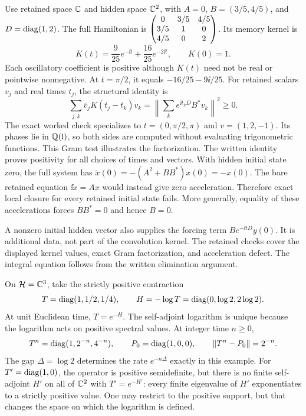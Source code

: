 Use retained space $\CC$ and hidden space $\CC^2$, with $A=0$, $B=(3/5,4/5)$, and $D=\operatorname{diag}(1,2)$. The full Hamiltonian is $\begin{pmatrix}0&3/5&4/5\\3/5&1&0\\4/5&0&2\end{pmatrix}$. Its memory kernel is
\[
K(t)=\frac9{25}e^{-\ii t}+\frac{16}{25}e^{-2\ii t},
\qquad K(0)=1.
\]
Each oscillatory coefficient is positive although $K(t)$ need not be real or pointwise nonnegative. At $t=\pi/2$, it equals $-16/25-9\ii/25$.
For retained scalars $v_j$ and real times $t_j$, the structural identity is
\[
\sum_{j,k}\overline v_jK(t_j-t_k)v_k
=\left\|\sum_k e^{\ii t_kD}B^*v_k\right\|^2\geq0.
\]
The exact worked check specializes to $t=(0,\pi/2,\pi)$ and $v=(1,2,-1)$. Its phases lie in $\QQ(\ii)$, so both sides are computed without evaluating trigonometric functions. This Gram test illustrates the factorization. The written identity proves positivity for all choices of times and vectors.
With hidden initial state zero, the full system has $\ddot x(0)=-(A^2+BB^*)x(0)=-x(0)$. The bare retained equation $\ii\dot x=Ax$ would instead give zero acceleration. Therefore exact local closure for every retained initial state fails. More generally, equality of these accelerations forces $BB^*=0$ and hence $B=0$.

A nonzero initial hidden vector also supplies the forcing term $Be^{-\ii tD}y(0)$. It is additional data, not part of the convolution kernel. The retained checks cover the displayed kernel values, exact Gram factorization, and acceleration defect. The integral equation follows from the written elimination argument.

On $\HH=\CC^3$, take the strictly positive contraction
\[
T=\operatorname{diag}(1,1/2,1/4),\qquad H=-\log T=\operatorname{diag}(0,\log2,2\log2).
\]
At unit Euclidean time, $T=e^{-H}$. The self-adjoint logarithm is unique because the logarithm acts on positive spectral values. At integer time $n\geq0$,
\[
T^n=\operatorname{diag}(1,2^{-n},4^{-n}),\qquad
P_0=\operatorname{diag}(1,0,0),\qquad\left\lVert T^n-P_0\right\rVert=2^{-n}.
\]
The gap $\Delta=\log2$ determines the rate $e^{-n\Delta}$ exactly in this example.
For $T'=\operatorname{diag}(1,0)$, the operator is positive semidefinite, but there is no finite self-adjoint $H'$ on all of $\CC^2$ with $T'=e^{-H'}$: every finite eigenvalue of $H'$ exponentiates to a strictly positive value. One may restrict to the positive support, but that changes the space on which the logarithm is defined.


